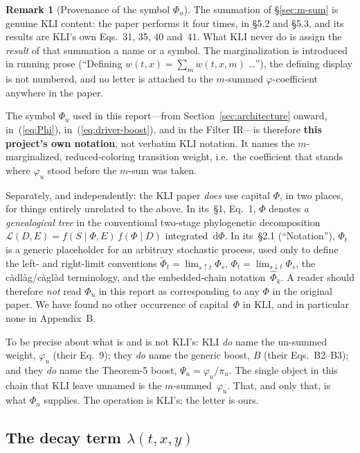 \documentclass[11pt,leqno]{article}
\newcommand{\dd}[1]{\,\mathrm{d}{#1}}
\newcommand{\lik}{\mathcal{L}}      %
\theoremstyle{plain}
\theoremstyle{definition}
\newtheorem{remark}[theorem]{Remark}
\begin{document}
\begin{remark}[Provenance of the symbol $\Phi_u$]
\label{rem:phi-provenance}
The summation of \S\ref{sec:m-sum} is genuine KLI content: the paper
performs it four times, in \S5.2 and \S5.3, and its results are KLI's
own Eqs.~31, 35, 40 and~41.  What KLI never do is assign the
\emph{result} of that summation a name or a symbol.  The
marginalization is introduced in running prose (``Defining
$w(t,x) = \sum_m w(t,x,m)$ \ldots''), the defining display is not
numbered, and no letter is attached to the $m$-summed
$\varphi$-coefficient anywhere in the paper.

The symbol $\Phi_u$ used in this report---from
Section~\ref{sec:architecture} onward, in~(\ref{eq:Phi}),
in~(\ref{eq:driver-boost}), and in the Filter IR---is therefore
\textbf{this project's own notation}, not verbatim KLI notation.  It
names the $m$-marginalized, reduced-coloring transition weight, i.e.\
the coefficient that stands where $\varphi_u$ stood before the $m$-sum
was taken.

Separately, and independently: the KLI paper \emph{does} use capital
$\Phi$, in two places, for things entirely unrelated to the above.
In its~\S1, Eq.~1, $\Phi$ denotes \emph{a genealogical tree} in the
conventional two-stage phylogenetic decomposition
$\lik(D,E) = f(S \mid \Phi, E)\, f(\Phi \mid D)$ integrated
$\dd{\Phi}$.  In its~\S2.1 (``Notation''), $\Phi_t$ is a generic
placeholder for an arbitrary stochastic process, used only to define
the left- and right-limit conventions
$\tilde{\Phi}_t = \lim_{s \uparrow t} \Phi_s$,
$\Phi_t = \lim_{s \downarrow t} \Phi_s$, the c\`adl\`ag/c\`agl\`ad
terminology, and the embedded-chain notation~$\hat{\Phi}_k$.
A reader should therefore \emph{not} read $\Phi_u$ in this report as
corresponding to any $\Phi$ in the original paper.  We have found no
other occurrence of capital~$\Phi$ in KLI, and in particular none in
Appendix~B.

To be precise about what is and is not KLI's: KLI \emph{do} name the
un-summed weight, $\varphi_u$ (their Eq.~9); they \emph{do} name the
generic boost, $B$ (their Eqs.~B2--B3); and they \emph{do} name the
Theorem-5 boost, $\Psi_u = \varphi_u / \pi_u$.  The single object in
this chain that KLI leave unnamed is the $m$-summed~$\varphi_u$.  That,
and only that, is what $\Phi_u$ supplies.  The operation is KLI's; the
letter is ours.
\end{remark}

\subsection{The decay term $\lambda(t,x,y)$}
\end{document}

